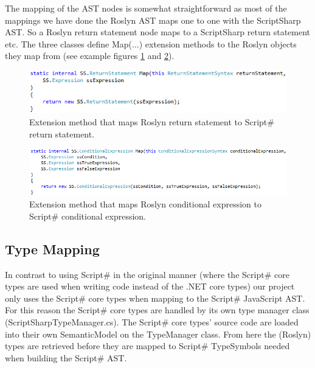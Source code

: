 		The mapping of the AST nodes is somewhat straightforward as most of the mappings we have done the Roslyn AST maps one to one with the ScriptSharp AST. So a Roslyn return statement node maps to a ScriptSharp return statement etc. The three classes define Map(...) extension methods to the Roslyn objects they map from (see example figures \ref{returnStatementMap} and \ref{conditionaleExpressionMap}).

		\begin{figure}[H]
			\begin{center}
				\centerline{\includegraphics[width=14cm]{resources/images/ReturnStatementMap.png}}
			\end{center}
			\caption{Extension method that maps Roslyn return statement to Script\# return statement.}
			\label{returnStatementMap}
		\end{figure}

		\begin{figure}[H]
			\begin{center}
				\centerline{\includegraphics[width=14cm]{resources/images/ConditionalExpressionMap.png}}
			\end{center}
			\caption{Extension method that maps Roslyn conditional expression to Script\# conditional expression.}
			\label{conditionaleExpressionMap}
		\end{figure}

	\subsection{Type Mapping} %
	\label{sub:type_mapping}
		In contrast to using Script\# in the original manner (where the Script\# core types are used when writing code instead of the .NET core types) our project only uses the Script\# core types when mapping to the Script\# JavaScript AST. For this reason the Script\# core types are handled by its own type manager class (ScriptSharpTypeManager.cs). The Script\# core types’ source code are loaded into their own SemanticModel on the TypeManager class. From here the (Roslyn) types are retrieved before they are mapped to Script\# TypeSymbols needed when building the Script\# AST.


